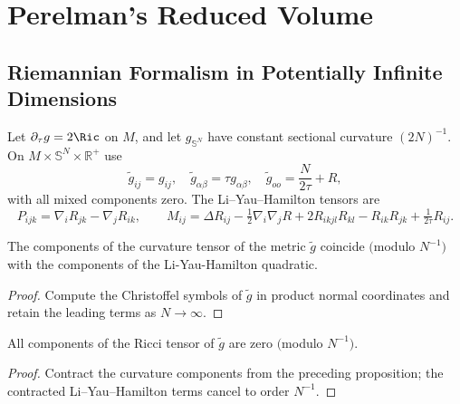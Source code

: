 \chapter{Perelman's Reduced Volume}
\label{chap:cz-reduced-volume}

\section{Riemannian Formalism in Potentially Infinite Dimensions}

Let $\partial_\tau g=2\Ric$ on $M$, and let $g_{\mathbb S^N}$ have
constant sectional curvature $(2N)^{-1}$.  On
$M\times\mathbb S^N\times\mathbb R^+$ use
\[
\tilde g_{ij}=g_{ij},\quad \tilde g_{\alpha\beta}=\tau g_{\alpha\beta},
\quad \tilde g_{oo}=\frac N{2\tau}+R,
\]
with all mixed components zero.  The Li--Yau--Hamilton tensors are
\[
P_{ijk}=\nabla_iR_{jk}-\nabla_jR_{ik},\qquad
M_{ij}=\Delta R_{ij}-\tfrac12\nabla_i\nabla_jR
+2R_{ikjl}R_{kl}-R_{ik}R_{jk}+\tfrac1{2\tau}R_{ij}.
\]

\begin{proposition}
  \label{prop:cz-space-time-curvature-and-the-liyauhamilton-quadratic}
The components of the curvature tensor of the metric $\tilde{g}$
coincide $($modulo $N^{-1})$ with the components of the
Li-Yau-Hamilton quadratic.
\end{proposition}

\begin{proof}
  \sketch Compute the Christoffel symbols of $\tilde g$ in product normal coordinates and retain the leading terms as $N\to\infty$.
\end{proof}

\begin{corollary}
  \label{cor:cz-space-time-ricci-flatness-modulo-inverse-dimension}
All components of the Ricci tensor of $\tilde{g}$ are zero
$($modulo $N^{-1})$.
\end{corollary}

\begin{proof}
  \sketch Contract the curvature components from the preceding proposition; the contracted Li--Yau--Hamilton terms cancel to order $N^{-1}$.
\end{proof}

